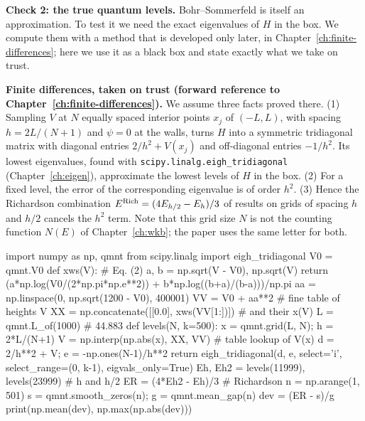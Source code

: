 \textbf{Check 2: the true quantum levels.} Bohr--Sommerfeld is itself an approximation. To test it we need the exact eigenvalues of $H$ in the box. We compute them with a method that is developed only later, in Chapter~\ref{ch:finite-differences}; here we use it as a black box and state exactly what we take on trust.
\begin{beyond}
\textbf{Finite differences, taken on trust (forward reference to Chapter~\ref{ch:finite-differences}).} We assume three facts proved there. (1) Sampling $V$ at $N$ equally spaced interior points $x_j$ of $(-L,L)$, with spacing $h=2L/(N+1)$ and $\psi=0$ at the walls, turns $H$ into a symmetric tridiagonal matrix with diagonal entries $2/h^2+V(x_j)$ and off-diagonal entries $-1/h^2$. Its lowest eigenvalues, found with \texttt{scipy.linalg.eigh\_tridiagonal} (Chapter~\ref{ch:eigen}), approximate the lowest levels of $H$ in the box. (2) For a fixed level, the error of the corresponding eigenvalue is of order $h^2$. (3) Hence the Richardson combination $E^{\rm Rich}=(4E_{h/2}-E_h)/3$ of results on grids of spacing $h$ and $h/2$ cancels the $h^2$ term. Note that this grid size $N$ is not the counting function $N(E)$ of Chapter~\ref{ch:wkb}; the paper uses the same letter for both.
\end{beyond}

\begin{pycode}
import numpy as np, qmnt
from scipy.linalg import eigh_tridiagonal
V0 = qmnt.V0
def xws(V):                                   # Eq. (2)
    a, b = np.sqrt(V - V0), np.sqrt(V)
    return (a*np.log(V0/(2*np.pi*np.e**2)) + b*np.log((b+a)/(b-a)))/np.pi
aa = np.linspace(0, np.sqrt(1200 - V0), 400001)
VV = V0 + aa**2                               # fine table of heights V
XX = np.concatenate([[0.0], xws(VV[1:])])     # and their x(V)
L = qmnt.L_of(1000)                   # 44.883
def levels(N, k=500):
    x = qmnt.grid(L, N); h = 2*L/(N+1)
    V = np.interp(np.abs(x), XX, VV)   # table lookup of V(x)
    d = 2/h**2 + V; e = -np.ones(N-1)/h**2
    return eigh_tridiagonal(d, e, select='i',
                            select_range=(0, k-1), eigvals_only=True)
Eh, Eh2 = levels(11999), levels(23999)  # h and h/2
ER = (4*Eh2 - Eh)/3                     # Richardson
n = np.arange(1, 501)
s = qmnt.smooth_zeros(n); g = qmnt.mean_gap(n)
dev = (ER - s)/g
print(np.mean(dev), np.max(np.abs(dev)))
\end{pycode}

